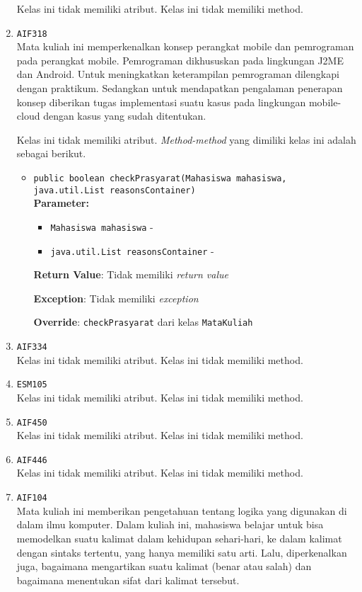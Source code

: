 \documentclass{article}
\begin{document}
\begin{enumerate}
Kelas ini tidak memiliki atribut. Kelas ini tidak memiliki method. \item \texttt{AIF318}\\ 
Mata kuliah ini memperkenalkan konsep perangkat mobile dan pemrograman pada perangkat 
 mobile. Pemrograman dikhususkan pada lingkungan J2ME dan Android.
 Untuk meningkatkan keterampilan pemrograman dilengkapi dengan praktikum. 
 Sedangkan untuk mendapatkan pengalaman penerapan konsep diberikan tugas implementasi suatu 
 kasus pada lingkungan mobile-cloud dengan kasus yang sudah ditentukan.

Kelas ini tidak memiliki atribut. \textit{Method-method} yang dimiliki kelas ini adalah sebagai berikut.
\begin{itemize}
\item \texttt{public boolean checkPrasyarat(Mahasiswa mahasiswa, java.util.List reasonsContainer)}\\ 


\textbf{Parameter:}\begin{itemize}
\item \texttt{Mahasiswa mahasiswa} - 
\item \texttt{java.util.List reasonsContainer} - 
\end{itemize}
\textbf{Return Value}: Tidak memiliki \textit{return value}

\textbf{Exception}: Tidak memiliki \textit{exception}

\textbf{Override}: \texttt{checkPrasyarat} dari kelas \texttt{MataKuliah}

\end{itemize}
\item \texttt{AIF334}\\ 


Kelas ini tidak memiliki atribut. Kelas ini tidak memiliki method. \item \texttt{ESM105}\\ 


Kelas ini tidak memiliki atribut. Kelas ini tidak memiliki method. \item \texttt{AIF450}\\ 


Kelas ini tidak memiliki atribut. Kelas ini tidak memiliki method. \item \texttt{AIF446}\\ 


Kelas ini tidak memiliki atribut. Kelas ini tidak memiliki method. \item \texttt{AIF104}\\ 
Mata kuliah ini memberikan pengetahuan tentang logika yang digunakan di 
 dalam ilmu komputer. Dalam kuliah ini, mahasiswa belajar untuk bisa 
 memodelkan suatu kalimat dalam kehidupan sehari-hari, ke dalam kalimat 
 dengan sintaks tertentu, yang hanya memiliki satu arti. Lalu, diperkenalkan 
 juga, bagaimana mengartikan suatu kalimat (benar atau salah) dan bagaimana 
 menentukan sifat dari kalimat tersebut.


\end{enumerate}
\end{document}
